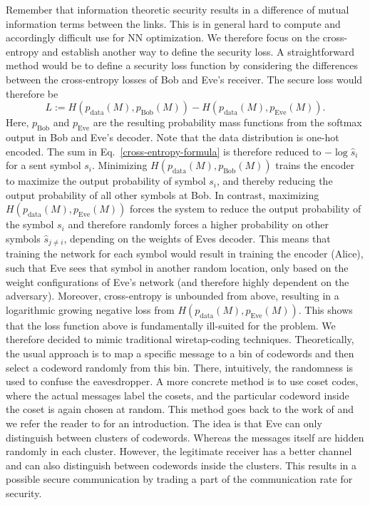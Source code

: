 \documentclass[conference]{IEEEtran}
\begin{document}
Remember that information theoretic security results in a difference of mutual information terms between the links. This is in general hard to compute and accordingly difficult use for NN optimization. We therefore focus on the cross-entropy and establish another way to define the security loss. A straightforward method would be to define a security loss function by considering the differences between the cross-entropy losses of Bob and Eve's receiver. The secure loss would therefore be 
\begin{equation}
L:=H(p_{\text{data}}(M),p_{\text{Bob}}(M)) - H(p_{\text{data}}(M),p_{\text{Eve}}(M)).
\end{equation}
Here, $p_{\text{Bob}}$ and $p_{\text{Eve}}$ are the resulting probability mass functions from the softmax output in Bob and Eve's decoder. Note that the data distribution is one-hot encoded. The sum in Eq.~\eqref{cross-entropy-formula} is therefore reduced to $-\log \hat{s}_i$ for a sent symbol $s_i$. Minimizing $H(p_{\text{data}}(M),p_{\text{Bob}}(M))$ trains the encoder to maximize the output probability of symbol $s_i$, and thereby reducing the output probability of all other symbols at Bob. In contrast, maximizing $H(p_{\text{data}}(M),p_{\text{Eve}}(M))$ forces the system to reduce the output probability of the symbol $s_i$ and therefore randomly forces a higher probability on other symbols $\hat{s}_{j\neq i}$, depending on the weights of Eves decoder. This means that training the network for each symbol would result in training the encoder (Alice), such that Eve sees that symbol in another random location, only based on the weight configurations of Eve's network (and therefore highly dependent on the adversary). Moreover, cross-entropy is unbounded from above, resulting in a logarithmic growing negative loss from $H(p_{\text{data}}(M),p_{\text{Eve}}(M))$. This shows that the loss function above is fundamentally ill-suited for the problem. We therefore decided to mimic traditional wiretap-coding techniques. Theoretically, the usual approach is to map a specific message to a bin of codewords and then select a codeword randomly from this bin. There, intuitively, the randomness is used to confuse the eavesdropper. A more concrete method is to use coset codes, where the actual messages label the cosets, and the particular codeword inside the coset is again chosen at random. This method goes back to the work of \cite{Wyner75} and we refer the reader to \cite[Appendix A]{Oggier16} for an introduction. The idea is that Eve can only distinguish between clusters of codewords. Whereas the messages itself are hidden randomly in each cluster. However, the legitimate receiver has a better channel and can also distinguish between codewords inside the clusters. This results in a possible secure communication by trading a part of the communication rate for security. 
\end{document}
